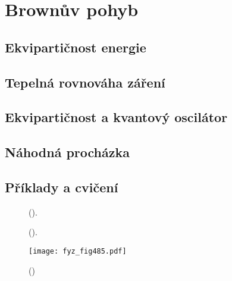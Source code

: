 \setchaptertoc
\chapter{Brownův pohyb}\label{fyz:IchapXLI}

  \section{Ekvipartičnost energie}\label{fyz:IchapXLIsecI}
  \section{Tepelná rovnováha záření}\label{fyz:IchapXLIsecII}
  \section{Ekvipartičnost a kvantový oscilátor}\label{fyz:IchapXLIsecIII}
  \section{Náhodná procházka}\label{fyz:IchapXLIsecIV}
  \section{Příklady a cvičení}\label{fyz:IchapXLIsecV}

  \begin{figure}[hb!] %
    \centering
      \newline
    \caption{
             (\cite[s.~601]{Feynman01}).}
    \label{fyz:fig483}
  \end{figure}

  \begin{figure}[hb!] %
    \centering
    \caption{
             (\cite[s.~601]{Feynman01}).}
    \label{fyz:fig484}
  \end{figure}

    \begin{figure}[ht!] %
      \centering
      \texttt{[image: fyz\_fig485.pdf]}
      \caption{ 
               (\cite[s.~707]{Feynman01})}
      \label{fyz:fig485}
    \end{figure}

